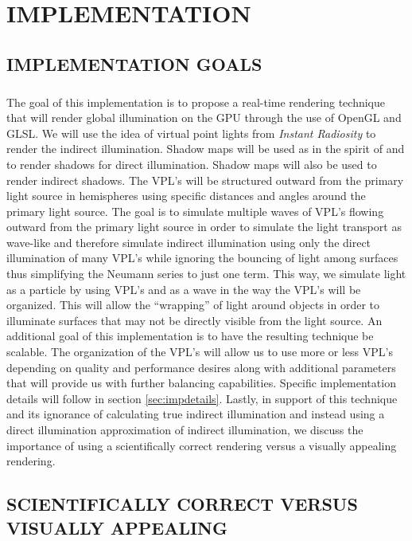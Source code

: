\chapter{IMPLEMENTATION}

\section{IMPLEMENTATION GOALS} \label{sec:impgoals}
\paragraph{}
The goal of this implementation is to propose a real-time rendering technique that will render global illumination on the GPU through the use of OpenGL and GLSL.  We will use the idea of virtual point lights from \textit{Instant Radiosity} \cite{Keller1997} to render the indirect illumination.  Shadow maps will be used as in the spirit of \cite{Williams1978} and \cite{Reeves1987} to render shadows for direct illumination.  Shadow maps will also be used to render indirect shadows.  The VPL's will be structured outward from the primary light source in hemispheres using specific distances and angles around the primary light source. The goal is to simulate multiple waves of VPL's flowing outward from the primary light source in order to simulate the light transport as wave-like and therefore simulate indirect illumination using only the direct illumination of many VPL's while ignoring the bouncing of light among surfaces thus simplifying the Neumann series to just one term.  This way, we simulate light as a particle by using VPL's and as a wave in the way the VPL's will be organized.  This will allow the ``wrapping'' of light around objects in order to illuminate surfaces that may not be directly visible from the light source.  An additional goal of this implementation is to have the resulting technique be scalable.  The organization of the VPL's will allow us to use more or less VPL's depending on quality and performance desires along with additional parameters that will provide us with further balancing capabilities.  Specific implementation details will follow in section \ref{sec:impdetails}.  Lastly, in support of this technique and its ignorance of calculating true indirect illumination and instead using a direct illumination approximation of indirect illumination, we discuss the importance of using a scientifically correct rendering versus a visually appealing rendering.

\section{SCIENTIFICALLY CORRECT VERSUS VISUALLY APPEALING} \label{sec:study}
